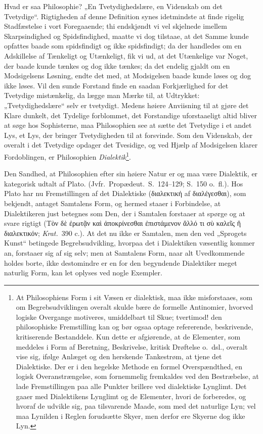 \documentclass[12pt,a4paper]{book}
\begin{document}
Hvad er saa Philosophie? „En Tvetydighedslære, en Videnskab om det
Tvetydige“. Rigtigheden af denne Definition synes idetmindste at finde
rigelig Stadfæstelse i vort Foregaaende; thi endskjøndt vi vel skjelnede
imellem Skarpsindighed og Spidsfindighed, maatte vi dog tilstaae, at det
Samme kunde opfattes baade som spidsfindigt og ikke spidsfindigt; da der
handledes om en Adskillelse af Tænkeligt og Utænkeligt, fik vi ud, at det
Utænkelige var Noget, der baade kunde tænkes og dog ikke tænkes; da det
endelig gjaldt om en Modsigelsens Løsning, endte det med, at Modsigelsen
baade kunde løses og dog ikke løses. Vil den sunde Forstand finde en
saadan Forkjærlighed for det Tvetydige mistænkelig, da lægge man Mærke
til, at Udtrykket: „Tvetydighedslære“ selv er tvetydigt. Medens høiere
Anviisning til at gjøre det Klare dunkelt, det Tydelige forblommet, det
Forstandige uforstaaeligt altid bliver at søge hos Sophisterne, maa
Philosophien see at sætte det Tvetydige i et andet Lys, et Lys, der
bringer Tvetydigheden til at forsvinde. Som den Videnskab, der overalt i
det Tvetydige opdager det Tvesidige, og ved Hjælp af Modsigelsen klarer
Fordoblingen, er Philosophien \emph{Dialektik}\footnote{At Philosophiens
Form i sit Væsen er dialektisk, maa ikke misforstaaes, som om
Begrebsudviklingen overalt skulde bære de formelle Antinomier, hvorved
logiske Overgange motiveres, umiddelbart til Skue; tvertimod! den
philosophiske Fremstilling kan og bør ogsaa optage refererende,
beskrivende, kritiserende Bestanddele. Kun dette er afgiørende, at de
Elementer, som meddeles i Form af Beretning, Beskrivelse, kritisk
Drøftelse o.\ dsl., overalt vise sig, ifølge Anlæget og den herskende
Tankestrøm, at tjene det Dialektiske. Der er i den hegelske Methode en
formel Overspændthed, en logisk Overanstrængelse, som fornemmelig
fremkaldes ved den Bestræbelse, at lade Fremstillingen paa alle Punkter
brillere ved
dialektiske Lynglimt. Det gaaer med Dialektikens Lynglimt og de
Elementer, hvori de forberedes, og hvoraf de udvikle sig, paa
tilsvarende Maade, som med det naturlige Lyn; vel maa Lynilden i Reglen
forudsætte Skyer, men derfor ere Skyerne dog ikke Lyn.}.

Den Sandhed, at Philosophien efter sin høiere Natur er og maa være
Dialektik, er kategorisk udtalt af Plato. (Jvfr.\ Propædeut.\ S.\
124--129; S.\ 150 o.\ fl.). Hos Plato har nu Fremstillingen af det
Dialektiske (διαλεκτική af διαλέγεσθαι), som bekjendt, antaget Samtalens
Form, og hermed staaer i Forbindelse, at Dialektikeren just betegnes som
Den, der i Samtalen forstaaer at spørge og at svare rigtigt (Τὸν δὲ
ἐρωτᾷν καὶ ἀποκρίνεσθαι ἐπιστάμενον ἄλλό τι σὺ καλεῖς ἢ διαλεκτικόν;
\textit{Krat.}\ 390 c.). At det nu ikke er Samtalen, men den ved
„Sprogets Kunst“ betingede Begrebsudvikling, hvorpaa det i Dialektiken
væsentlig kommer an, forstaaer sig af sig selv; men at Samtalens Form,
naar alt Uvedkommende holdes borte, ikke destomindre er en for den
begyndende Dialektiker meget naturlig Form, kan let oplyses ved nogle
Exempler.
\end{document}
